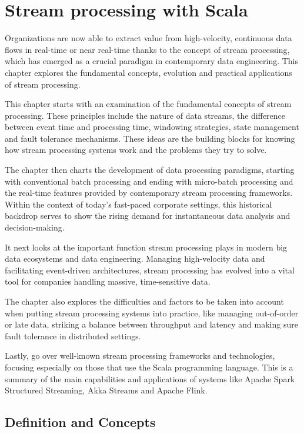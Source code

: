 \chapter{Stream processing with Scala}

Organizations are now able to extract value from high-velocity, continuous data flows in real-time or near real-time thanks to the concept of stream processing, which has emerged as a crucial paradigm in contemporary data engineering. This chapter explores the fundamental concepts, evolution and practical applications of stream processing.

This chapter starts with an examination of the fundamental concepts of stream processing. These principles include the nature of data streams, the difference between event time and processing time, windowing strategies, state management and fault tolerance mechanisms. These ideas are the building blocks for knowing how stream processing systems work and the problems they try to solve.

The chapter then charts the development of data processing paradigms, starting with conventional batch processing and ending with micro-batch processing and the real-time features provided by contemporary stream processing frameworks. Within the context of today's fast-paced corporate settings, this historical backdrop serves to show the rising demand for instantaneous data analysis and decision-making.

It next looks at the important function stream processing plays in modern big data ecosystems and data engineering. Managing high-velocity data and facilitating event-driven architectures, stream processing has evolved into a vital tool for companies handling massive, time-sensitive data.

The chapter also explores the difficulties and factors to be taken into account when putting stream processing systems into practice, like managing out-of-order or late data, striking a balance between throughput and latency and making sure fault tolerance in distributed settings.

Lastly, go over well-known stream processing frameworks and technologies, focusing especially on those that use the Scala programming language. This is a summary of the main capabilities and applications of systems like Apache Spark Structured Streaming, Akka Streams and Apache Flink.

\section{Definition and Concepts}

